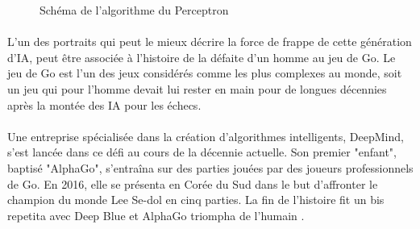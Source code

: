 \documentclass[10pt, french, a4paper]{report}
\begin{document}
\begin{center}
\begin{figure}[hbt!]
    \caption{Schéma de l'algorithme du Perceptron \citep{rosenblatt_perceptron_1958}}
    \label{fig:perceptron}
\end{figure}
\end{center}

\paragraph{}
L’un des portraits qui peut le mieux décrire la force de frappe de cette génération d’IA, peut être associée à l’histoire de la défaite d’un homme au jeu de Go. Le jeu de Go est l’un des jeux considérés comme les plus complexes au monde, soit un jeu qui pour l’homme devait lui rester en main pour de longues décennies après la montée des IA pour les échecs.


\paragraph{}
Une entreprise spécialisée dans la création d’algorithmes intelligents, DeepMind, s’est lancée dans ce défi au cours de la décennie actuelle. Son premier "enfant", baptisé "AlphaGo", s’entraîna sur des parties jouées par des joueurs professionnels de Go. En 2016, elle se présenta en Corée du Sud dans le but d’affronter le champion du monde Lee Se-dol en cinq parties. La fin de l’histoire fit un bis repetita avec Deep Blue et AlphaGo triompha de l’humain \citep{deepmind_alphago_2016}.
\end{document}
